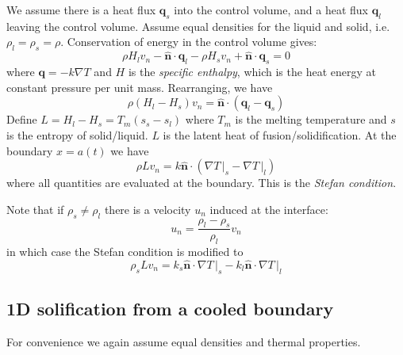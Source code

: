 \documentclass{jknotes}
\begin{document}
We assume there is a heat flux $\symbf{q}_s$ into the control volume, and a
heat flux $\symbf{q}_l$ leaving the control volume. Assume equal densities for
the liquid and solid, i.e. $\rho_l = \rho_s = \rho$. Conservation of energy in
the control volume gives:
\begin{equation}
	\rho H_l v_n - \hat{\symbf{n}}\cdot\symbf{q}_l - \rho H_s v_n +
	\hat{\symbf{n}} \cdot \symbf{q}_s = 0
\end{equation}
where $\symbf{q} = - k \nabla T$ and $H$ is the \emph{specific enthalpy},
which is the heat energy at constant pressure per unit mass. Rearranging, we
have
\begin{equation}
	\rho (H_l - H_s)v_n = \hat{\symbf{n}}\cdot (\symbf{q}_l - \symbf{q}_s)
\end{equation}
Define $L = H_l - H_s = T_m (s_s - s_l)$ where $T_m$ is the melting
temperature and $s$ is the entropy of solid/liquid. $L$ is the latent heat of
fusion/solidification. At the boundary $x=a(t)$ we have
\begin{equation}
	\rho L v_n = k \hat{\symbf{n}} \cdot (\left.\nabla T \,\right|_s -
	\left.\nabla T \,\right|_l)
\end{equation}
where all quantities are evaluated at the boundary. This is the \emph{Stefan
condition}.

Note that if $\rho_s \ne \rho_l$ there is a velocity $u_n$ induced at the
interface:
\begin{equation}
	u_n = \frac{\rho_l - \rho_s}{\rho_l} v_n
\end{equation}
in which case the Stefan condition is modified to
\begin{equation}
	\rho_s L v_n = k_s \hat{\symbf{n}} \cdot \left.\nabla T \,\right|_s - k_l
	\hat{\symbf{n}} \cdot \left.\nabla T \,\right|_l
\end{equation}

\subsection{1D solification from a cooled boundary}
For convenience we again assume equal densities and thermal properties. 
\begin{center}
\end{center}
\end{document}
